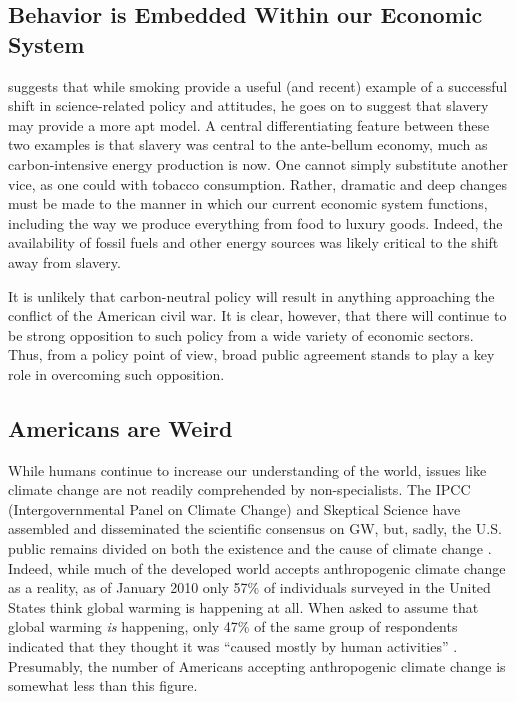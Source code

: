 \subsection{Behavior is Embedded Within our Economic System}

\textcite{hoffman_climate_2010} suggests that while smoking provide a useful
(and recent) example of a successful shift in science-related policy and
attitudes, he goes on to suggest that slavery may provide a more apt model. A
central differentiating feature between these two examples is that slavery was
central to the ante-bellum economy, much as carbon-intensive energy production
is now.  One cannot simply substitute another vice, as one could with tobacco
consumption.  Rather, dramatic and deep changes must be made to the manner in
which our current economic system functions, including the way we produce
everything from food to luxury goods. Indeed, the availability of fossil fuels
and other energy sources was likely critical to the shift away from slavery.

It is unlikely that carbon-neutral policy will result in anything approaching
the conflict of the American civil war. It is clear, however, that there will
continue to be strong opposition to such policy from a wide variety of economic
sectors. Thus, from a policy point of view, broad public agreement stands to
play a key role in overcoming such opposition.

\subsection{Americans are Weird}

While humans continue to increase our understanding of the world, issues like
climate change are not readily comprehended by non-specialists. The IPCC
(Intergovernmental Panel on Climate Change) and Skeptical Science have assembled
and disseminated the scientific consensus on GW, but, sadly, the U.S.  public
remains divided on both the existence and the cause of climate change
\parencite[cf.][]{hoffman_growing_2011}. Indeed, while much of the developed
world accepts anthropogenic climate change as a reality, as of January 2010 only
57\% of individuals surveyed in the United States think global warming is
happening at all. When asked to assume that global warming \emph{is} happening,
only 47\% of the same group of respondents indicated that they thought it was
``caused mostly by human activities'' \parencite[Q47 and Q50
in][]{leiserowitz_climate_2010}.  Presumably, the number of Americans accepting
anthropogenic climate change is somewhat less than this figure. 

